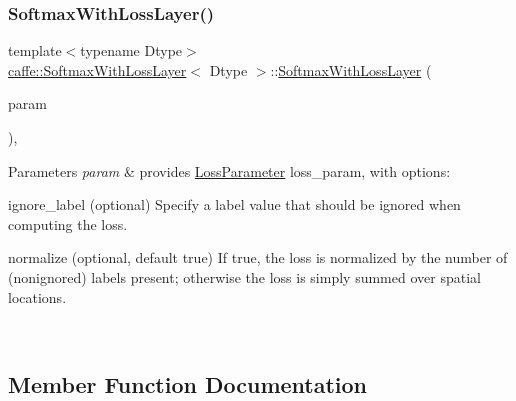 \subsubsection{\texorpdfstring{Softmax\+With\+Loss\+Layer()}{SoftmaxWithLossLayer()}\hspace{0.1cm}{\footnotesize\ttfamily [2/2]}}
{\footnotesize\ttfamily template$<$typename Dtype$>$ \\
\mbox{\hyperlink{classcaffe_1_1_softmax_with_loss_layer}{caffe\+::\+Softmax\+With\+Loss\+Layer}}$<$ Dtype $>$\+::\mbox{\hyperlink{classcaffe_1_1_softmax_with_loss_layer}{Softmax\+With\+Loss\+Layer}} (\begin{DoxyParamCaption}\item[{const \mbox{\hyperlink{classcaffe_1_1_layer_parameter}{Layer\+Parameter}} \&}]{param }\end{DoxyParamCaption})\hspace{0.3cm}{\ttfamily [inline]}, {\ttfamily [explicit]}}


\begin{DoxyParams}{Parameters}
{\em param} & provides \mbox{\hyperlink{classcaffe_1_1_loss_parameter}{Loss\+Parameter}} loss\+\_\+param, with options\+:
\begin{DoxyItemize}
\item ignore\+\_\+label (optional) Specify a label value that should be ignored when computing the loss.
\item normalize (optional, default true) If true, the loss is normalized by the number of (nonignored) labels present; otherwise the loss is simply summed over spatial locations. 
\end{DoxyItemize}\\
\hline
\end{DoxyParams}


\subsection{Member Function Documentation}
\mbox{\label{classcaffe_1_1_softmax_with_loss_layer_a39d8b7d59f2c951ac2573827f181284f}} 
